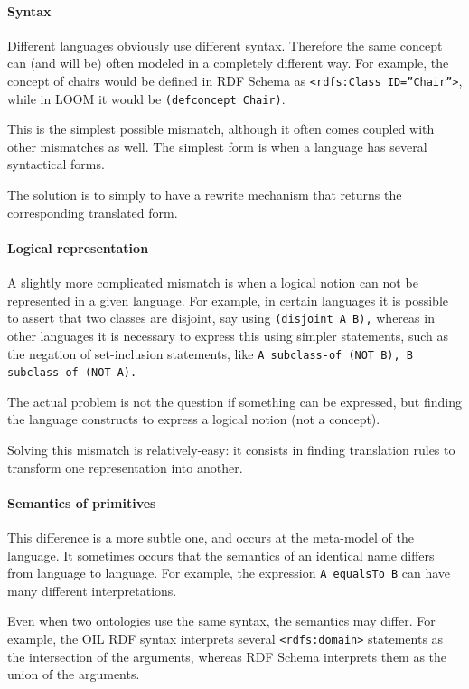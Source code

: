 \paragraph{Syntax}
Different languages obviously use different syntax. Therefore the same
concept can (and will be) often modeled in a completely different way.
For example, the concept of chairs would be defined in RDF Schema as
\texttt{{\textless}rdfs:Class
ID={\textquotedblright}Chair{\textquotedblright}{\textgreater}}, while
in LOOM it would be \texttt{(defconcept Chair)}. 

This is the simplest possible mismatch, although it often comes coupled
with other mismatches as well. The simplest form is when a language has
several syntactical forms. 

The solution is to simply to have a rewrite mechanism that returns the
corresponding translated form. 

\paragraph{Logical representation}
A slightly more complicated mismatch is when a logical notion can not be
represented in a given language. For example, in certain languages it
is possible to assert that two classes are disjoint, say using
\texttt{(disjoint A B),} whereas in other languages it is
necessary to express this using simpler statements, such as the
negation of set-inclusion statements, like \texttt{A
subclass-of (NOT B), B subclass-of (NOT A).} 

The actual problem is not the question if something can be expressed,
but finding the language constructs to express a logical notion (not a
concept). 

Solving this mismatch is relatively-easy: it consists in finding
translation rules to transform one representation into another. 

\paragraph{Semantics of primitives}
This difference is a more subtle one, and occurs at the meta-model of
the language. It sometimes occurs that the semantics of an identical
name differs from language to language. For example, the expression
\texttt{A equalsTo B} can have many different
interpretations. 

Even when two ontologies use the same syntax, the semantics may differ.
For example, the OIL RDF syntax interprets several
\texttt{{\textless}rdfs:domain{\textgreater}} statements
as the intersection of the arguments, whereas RDF Schema interprets
them as the union of the arguments. 

